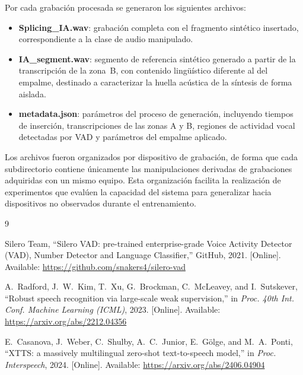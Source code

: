 Por cada grabación procesada se generaron los siguientes archivos:

\begin{itemize}
    \item \textbf{Splicing\_IA.wav}: grabación completa con el fragmento sintético
    insertado, correspondiente a la clase de audio manipulado.

    \item \textbf{IA\_segment.wav}: segmento de referencia sintético generado a partir
    de la transcripción de la zona~B, con contenido lingüístico diferente al del empalme,
    destinado a caracterizar la huella acústica de la síntesis de forma aislada.

    \item \textbf{metadata.json}: parámetros del proceso de generación, incluyendo
    tiempos de inserción, transcripciones de las zonas A y B, regiones de actividad vocal
    detectadas por VAD y parámetros del empalme aplicado.
\end{itemize}

Los archivos fueron organizados por dispositivo de grabación, de forma que cada
subdirectorio contiene únicamente las manipulaciones derivadas de grabaciones
adquiridas con un mismo equipo. Esta organización facilita la realización de experimentos
que evalúen la capacidad del sistema para generalizar hacia dispositivos no observados
durante el entrenamiento.

\begin{thebibliography}{9}

Silero Team, ``Silero VAD: pre-trained enterprise-grade Voice Activity Detector (VAD),
Number Detector and Language Classifier,'' GitHub, 2021.
[Online]. Available: \url{https://github.com/snakers4/silero-vad}

A.~Radford, J.~W.~Kim, T.~Xu, G.~Brockman, C.~McLeavey, and I.~Sutskever,
``Robust speech recognition via large-scale weak supervision,''
in \textit{Proc. 40th Int. Conf. Machine Learning (ICML)}, 2023.
[Online]. Available: \url{https://arxiv.org/abs/2212.04356}

E.~Casanova, J.~Weber, C.~Shulby, A.~C.~Junior, E.~Gölge, and M.~A.~Ponti,
``XTTS: a massively multilingual zero-shot text-to-speech model,''
in \textit{Proc. Interspeech}, 2024.
[Online]. Available: \url{https://arxiv.org/abs/2406.04904}

\end{thebibliography}
